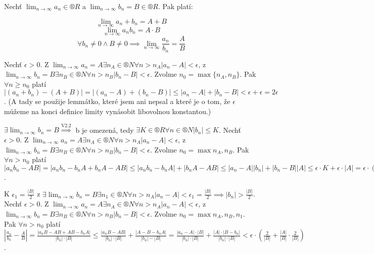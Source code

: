 \documentclass[12pt]{article}					%
\begin{document}
        \begin{veta}
            Nechť $\lim_{n \rightarrow ∞} a_n \in ®R$ a $\lim_{n \rightarrow ∞} b_n = B\in®R$. Pak platí:

            $$ \lim_{n \rightarrow ∞} a_n + b_n = A + B $$
            $$ \lim_{n \rightarrow ∞} a_n b_n = A\cdot B $$
            $$ \forall b_n \neq 0 \land B \neq 0 \implies \lim_{n \rightarrow ∞} \frac{a_n}{b_n} = \frac{A}{B} $$


            \begin{dukazin}
                Nechť $\epsilon > 0$. Z $\lim_{n \rightarrow ∞} a_n = A\exists n_A \in ®N \forall n>n_A |a_n - A| < \epsilon$, z $\lim_{n \rightarrow ∞} b_n = B\exists n_B \in ®N \forall n>n_B |b_n - B| < \epsilon$. Zvolme $n_0 = \max\{n_A, n_B\}$. Pak $\forall n≥ n_0$ platí $|(a_n + b_n) - (A + B)| = |(a_n - A) + (b_n - B)| ≤ |a_n - A| + |b_n - B| < \epsilon + \epsilon = 2\epsilon$. (A tady se použije lemmátko, které jsem ani nepsal a které je o tom, že $\epsilon$ můžeme na konci definice limity vynásobit libovolnou konstantou.)

                $\exists \lim_{n \rightarrow ∞} b_n = B \stackrel{\text{V2.2}}{\implies}$ b je omezená, tedy $\exists K \in ®R \forall n \in ®N |b_n|≤K$. Nechť $\epsilon > 0$. Z $\lim_{n \rightarrow ∞} a_n = A\exists n_A \in ®N \forall n>n_A |a_n - A| < \epsilon$, z $\lim_{n \rightarrow ∞} b_n = B\exists n_B \in ®N \forall n>n_B |b_n - B| < \epsilon$. Zvolme $n_0 = \max{n_A, n_B}$. Pak $\forall n>n_0$ platí $|a_nb_n - AB| = |a_nb_n - b_nA + b_nA - AB|≤|a_nb_n-b_nA| + |b_nA - AB|≤|a_n - A||b_n| + |b_n - B||A|≤\epsilon \cdot K + \epsilon \cdot |A| = \epsilon \cdot (K + |A|)$.

                K $\epsilon_1 = \frac{|B|}{2}$ z $\exists \lim_{n \rightarrow ∞} b_n = B \exists n_1 \in ®N \forall n>n_A |a_n - A| < \epsilon_1 = \frac{|B|}{2} \implies |b_n| > \frac{|B|}{2}$. Nechť $\epsilon > 0$. Z $\lim_{n \rightarrow ∞} a_n = A\exists n_A \in ®N \forall n>n_A |a_n - A| < \epsilon$, z $\lim_{n \rightarrow ∞} b_n = B\exists n_B \in ®N \forall n>n_B |b_n - B| < \epsilon$. Zvolme $n_0 = \max{n_A, n_B, n_1}$. Pak $\forall n>n_0$ platí $|\frac{a_n}{b_n} - \frac{A}{B}| = \frac{|a_nB - AB + AB - b_nA|}{|b_n|\cdot|B|} ≤ \frac{|a_nB - AB|}{|b_n|\cdot |B|} + \frac{|A-B-b_nA|}{|b_n| - |B|} = \frac{|a_n - A|\cdot |B|}{|b_n|\cdot |B|} + \frac{|A|\cdot |B-b_n|}{|b_n|\cdot |B|} < \epsilon \cdot (\frac{2}{|B|} + \frac{|A|}{|B|}\cdot\frac{2}{|B|})$.
            \end{dukazin}
        \end{veta}
\end{document}
